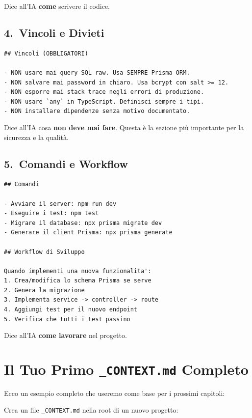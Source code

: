 Dice all'IA \textbf{come} scrivere il codice.

\subsection{4.\ Vincoli e Divieti}

\begin{lstlisting}[language={}]
## Vincoli (OBBLIGATORI)

- NON usare mai query SQL raw. Usa SEMPRE Prisma ORM.
- NON salvare mai password in chiaro. Usa bcrypt con salt >= 12.
- NON esporre mai stack trace negli errori di produzione.
- NON usare `any` in TypeScript. Definisci sempre i tipi.
- NON installare dipendenze senza motivo documentato.
\end{lstlisting}

Dice all'IA cosa \textbf{non deve mai fare}. Questa è la sezione più importante per la sicurezza e la qualità.

\subsection{5.\ Comandi e Workflow}

\begin{lstlisting}[language={}]
## Comandi

- Avviare il server: npm run dev
- Eseguire i test: npm test
- Migrare il database: npx prisma migrate dev
- Generare il client Prisma: npx prisma generate

## Workflow di Sviluppo

Quando implementi una nuova funzionalita':
1. Crea/modifica lo schema Prisma se serve
2. Genera la migrazione
3. Implementa service -> controller -> route
4. Aggiungi test per il nuovo endpoint
5. Verifica che tutti i test passino
\end{lstlisting}

Dice all'IA \textbf{come lavorare} nel progetto.

\section{Il Tuo Primo \texttt{\_CONTEXT.md} Completo}

Ecco un esempio completo che useremo come base per i prossimi capitoli:

\begin{praticabox}[title={Pratica --- Crea il tuo primo file di contesto}]
Crea un file \texttt{\_CONTEXT.md} nella root di un nuovo progetto:
\end{praticabox}

